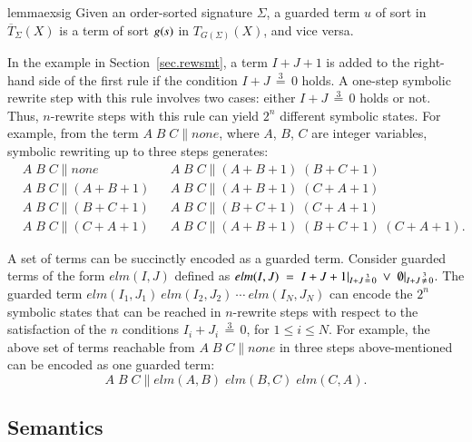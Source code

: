 \begin{restatable}{lemma}{exsig}
\label{lemma:exsig}
Given an order-sorted signature $\Sigma$, a guarded term $u$ of sort
 in $\overline{T}_{\Sigma}(X)$ is a term of sort $g(\textit{s})$
in $T_{G(\Sigma)}(X)$, and vice versa.
\end{restatable}


\begin{example}\label{ex:syntax}
In the example in Section~\ref{sec.rewsmt}, a term $I + J
+ 1$ is added to the right-hand side of the first rule if the
condition $I + J \,\stackrel{\scriptscriptstyle 3}{=}\, 0$ holds. A
one-step symbolic rewrite step with this rule involves two cases:
either $I + J \,\stackrel{\scriptscriptstyle 3}{=}\, 0$ holds or
not. Thus, $n$-rewrite steps with this rule can yield $2^n$ different
symbolic states.
%
For example,
from the term $A\;B\;C\parallel \mathit{none}$,
where $A$, $B$, $C$ are integer variables,
symbolic rewriting up to three steps generates:
%
\begin{align*}
&
A\;B\;C\parallel \mathit{none}
&&
A\;B\;C\parallel (A + B + 1)\;(B + C + 1)
\\
&
A\;B\;C\parallel (A + B + 1)
&&
A\;B\;C\parallel (A + B + 1)\;(C + A + 1)
\\
&
A\;B\;C\parallel (B + C + 1)
&&
A\;B\;C\parallel (B + C + 1)\;(C + A + 1)
\\
&
A\;B\;C\parallel (C + A + 1)
&&
A\;B\;C\parallel (A + B + 1)\;(B + C + 1)\;(C + A + 1).
\end{align*}

A set of terms can be succinctly encoded as a guarded term.
%
Consider guarded terms of the form $\mathit{elm}(I,J)$ defined as
$\mathit{elm}(I,J) \;=\; I + J + 1 |\usub{I + J \,\stackrel{3}{=}\, 0}
\;\vee\; \emptyset |\usub{I + J \,\stackrel{3}{\not=}\, 0}$.  The
guarded term
$\mathit{elm}(I_1,J_1)\ \mathit{elm}(I_2,J_2)\ \cdots\ \mathit{elm}(I_N,
J_N)$ can encode the $2^n$ symbolic states that can be reached in
$n$-rewrite steps with respect to the satisfaction of the $n$
conditions $I_i + J_i \,\stackrel{\scriptscriptstyle 3}{=}\, 0$, for
$1 \leq i \leq N$.
%
For example, the above set of terms reachable from $A\;B\;C\parallel
\mathit{none}$ in three steps above-mentioned can be encoded as one
guarded term:
\[
A\;B\;C\parallel \mathit{elm}(A,B)\;\mathit{elm}(B,C)\;\mathit{elm}(C,A).
\]
\end{example}


\subsection{Semantics}

